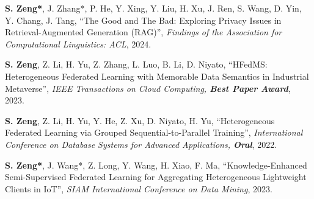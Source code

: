 \documentclass[12pt,letterpaper]{article}
\newenvironment{publist}{%
  \begin{list}{}{%
    \setlength{\leftmargin}{34mm}%
    \setlength{\labelwidth}{32mm}%
    \setlength{\labelsep}{2mm}%
    \setlength{\itemsep}{1.5mm}%
    \setlength{\parsep}{0pt}%
    \setlength{\topsep}{1.5mm}%
    \renewcommand{\makelabel}[1]{\bfseries\color{accent}##1\hfill}%
  }}{\end{list}}
\begin{document}
\begin{publist}
\item[{[ACL'24]}] \textbf{S. Zeng*}, J. Zhang*, P. He, Y. Xing, Y. Liu, H. Xu, J. Ren, S. Wang, D. Yin, Y. Chang, J. Tang, ``The Good and The Bad: Exploring Privacy Issues in Retrieval-Augmented Generation (RAG)'', \textit{Findings of the Association for Computational Linguistics: ACL}, 2024.
\item[{[IEEE TCC, Best Paper]}] \textbf{S. Zeng}, Z. Li, H. Yu, Z. Zhang, L. Luo, B. Li, D. Niyato, ``HFedMS: Heterogeneous Federated Learning with Memorable Data Semantics in Industrial Metaverse'', \textit{IEEE Transactions on Cloud Computing, \textbf{\color{honor}Best Paper Award}}, 2023.
\item[{[DASFAA'22, Oral]}] \textbf{S. Zeng}, Z. Li, H. Yu, Y. He, Z. Xu, D. Niyato, H. Yu, ``Heterogeneous Federated Learning via Grouped Sequential-to-Parallel Training'', \textit{International Conference on Database Systems for Advanced Applications, \textbf{\color{honor}Oral}}, 2022.
\item[{[SDM'23]}] \textbf{S. Zeng*}, J. Wang*, Z. Long, Y. Wang, H. Xiao, F. Ma, ``Knowledge-Enhanced Semi-Supervised Federated Learning for Aggregating Heterogeneous Lightweight Clients in IoT'', \textit{SIAM International Conference on Data Mining}, 2023.
\end{publist}
\end{document}
